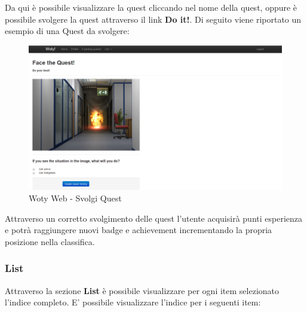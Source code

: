 Da qui è possibile visualizzare la quest cliccando nel nome della quest, oppure è possibile svolgere la quest attraverso il link \textbf{Do it!}.
Di seguito viene riportato un esempio di una Quest da svolgere:

\begin{center}
\begin{figure}[H]
\centering
\includegraphics[scale=0.35]{images/wotyWeb/quest.png}
\caption{Woty Web - Svolgi Quest}
\label{ww-quest}
\end{figure}
\end{center}


 Attraverso un corretto svolgimento delle quest l'utente acquisirà punti esperienza e potrà raggiungere nuovi badge e achievement incrementando la propria posizione nella classifica.



\subsubsection{List}
Attraverso la sezione \textbf{List} è possibile visualizzare per ogni item selezionato l'indice completo. E' possibile visualizzare l'indice per i seguenti item:

